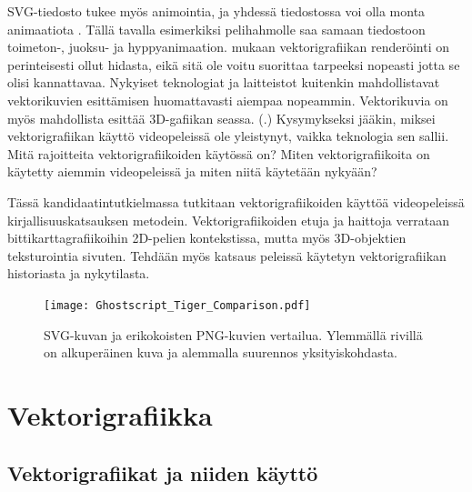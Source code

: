 \documentclass[utf8,bachelor]{gradu3}
\newcommand{\parencitedot}[1]{(\cite{#1}.)}
\begin{document}
SVG-tiedosto tukee myös animointia, ja yhdessä tiedostossa voi olla monta animaatiota \parencite{RefWorks:doc:5bd74719e4b0e42e08f6333b}. Tällä tavalla esimerkiksi pelihahmolle saa samaan tiedostoon toimeton-, juoksu- ja hyppyanimaation. \textcite{RefWorks:doc:5bc4a5cce4b080e02f7eff1b} mukaan vektorigrafiikan renderöinti on perinteisesti ollut hidasta, eikä sitä ole voitu suorittaa tarpeeksi nopeasti jotta se olisi kannattavaa. Nykyiset teknologiat ja laitteistot kuitenkin mahdollistavat vektorikuvien esittämisen huomattavasti aiempaa nopeammin. Vektorikuvia on myös mahdollista esittää 3D-gafiikan seassa. \parencitedot{RefWorks:doc:5bc4a5cce4b080e02f7eff1b} Kysymykseksi jääkin, miksei vektorigrafiikan käyttö videopeleissä ole yleistynyt, vaikka teknologia sen sallii. Mitä rajoitteita vektorigrafiikoiden käytössä on? Miten vektorigrafiikoita on käytetty aiemmin videopeleissä ja miten niitä käytetään nykyään?

Tässä kandidaatintutkielmassa tutkitaan vektorigrafiikoiden käyttöä videopeleissä kirjallisuuskatsauksen metodein. Vektorigrafiikoiden etuja ja haittoja verrataan bittikarttagrafiikoihin 2D-pelien kontekstissa, mutta myös 3D-objektien teksturointia sivuten. Tehdään myös katsaus peleissä käytetyn vektorigrafiikan historiasta ja nykytilasta.

\begin{figure}[!b]
	\centering
	\texttt{[image: Ghostscript\_Tiger\_Comparison.pdf]}
    \caption{SVG-kuvan ja erikokoisten PNG-kuvien vertailua. Ylemmällä rivillä on alkuperäinen kuva ja alemmalla suurennos yksityiskohdasta.}\label{tiikeri}
\end{figure}

\chapter{Vektorigrafiikka}

\section{Vektorigrafiikat ja niiden käyttö}\label{määrittely}

\end{document}
